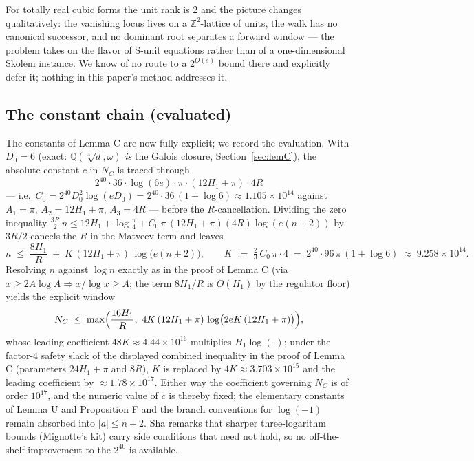\documentclass[11pt]{amsart}
\theoremstyle{plain}
\theoremstyle{remark}
\begin{document}
For totally real cubic forms the unit rank is 2 and the picture
changes qualitatively: the vanishing locus lives on a
$\mathbb{Z}^2$-lattice of units, the walk has no canonical successor,
and no dominant root separates a forward window --- the problem takes
on the flavor of S-unit equations rather than of a one-dimensional
Skolem instance. We know of no route to a $2^{O(s)}$ bound there and
explicitly defer it; nothing in this paper's method addresses it.

\subsection{The constant chain (evaluated)}\label{rem:cchain}

The constants of Lemma C are now fully explicit; we record the
evaluation. With $D_0 = 6$ (exact:
$\mathbb{Q}(\sqrt[3]{d}, \omega)$ \emph{is} the Galois closure,
Section~\ref{sec:lemC}), the absolute constant $c$ in $N_C$ is traced
through
\[
2^{40}\cdot 36\cdot\log(6e)\cdot\pi\cdot(12H_1 + \pi)\cdot 4R
\]
--- i.e.\ $C_0 = 2^{40}D_0^2\log(eD_0) = 2^{40}\cdot 36\,(1 + \log 6)
\approx 1.105\times 10^{14}$ against $A_1 = \pi$,
$A_2 = 12H_1 + \pi$, $A_3 = 4R$ --- before the $R$-cancellation.
Dividing the zero inequality
$\tfrac{3R}{2}\,n \le 12H_1 + \log\tfrac{\pi}{4} + C_0\,\pi\,(12H_1 +
\pi)(4R)\log(e(n+2))$ by $3R/2$ cancels the $R$ in the Matveev term
and leaves
\[
n \;\le\; \frac{8H_1}{R} \;+\; K\,(12H_1 + \pi)\,
\log\bigl(e(n+2)\bigr),
\qquad K \;:=\; \tfrac{2}{3}\,C_0\,\pi\cdot 4
\;=\; 2^{40}\cdot 96\,\pi\,(1 + \log 6)
\;\approx\; 9.258\times 10^{14}.
\]
Resolving $n$ against $\log n$ exactly as in the proof of Lemma C
(via $x \ge 2A\log A \Rightarrow x/\log x \ge A$; the term $8H_1/R$
is $O(H_1)$ by the regulator floor) yields the explicit window
\[
N_C \;\le\; \max\Bigl(\frac{16H_1}{R},\
4K\,(12H_1 + \pi)\,\log\bigl(2eK\,(12H_1 + \pi)\bigr)\Bigr),
\]
whose leading coefficient $48K \approx 4.44\times 10^{16}$ multiplies
$H_1\log(\cdot)$; under the factor-4 safety slack of the displayed
combined inequality in the proof of Lemma C (parameters
$24H_1 + \pi$ and $8R$), $K$ is replaced by
$4K \approx 3.703\times 10^{15}$ and the leading coefficient by
$\approx 1.78\times 10^{17}$. Either way the coefficient governing
$N_C$ is of order $10^{17}$, and the numeric value of $c$ is thereby
fixed; the elementary constants of Lemma U and Proposition F and the
branch conventions for $\log(-1)$ remain absorbed into
$|a| \le n+2$. Sha remarks \cite[\S 2.4]{Sha19} that sharper
three-logarithm bounds (Mignotte's kit) carry side conditions that
need not hold, so no off-the-shelf improvement to the $2^{40}$ is
available.
\end{document}
